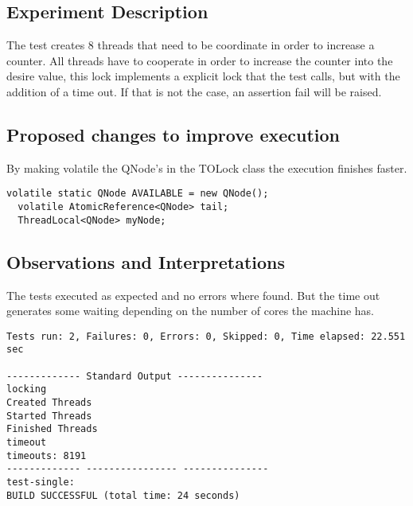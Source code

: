 \subsection{Experiment Description} 
\par
The test creates $8$ threads that need to be coordinate in order to increase a counter. All threads have to cooperate in order to increase the counter into the desire value, this lock implements a explicit lock that the test calls, but with the addition of a time out.
If that is not the case, an assertion fail will be raised.
\par


\subsection{Proposed changes to improve execution}

\par
By making volatile the QNode's in the TOLock class the execution finishes faster.
\begin{lstlisting}[frame=single,breaklines=true]
  volatile static QNode AVAILABLE = new QNode();
  volatile AtomicReference<QNode> tail;
  ThreadLocal<QNode> myNode;
\end{lstlisting}


\subsection{Observations and Interpretations}

\par
The tests executed as expected and no errors where found. But the time out generates some waiting depending on the number of cores the machine has.

\begin{lstlisting}[frame=single,breaklines=true]
Tests run: 2, Failures: 0, Errors: 0, Skipped: 0, Time elapsed: 22.551 sec

------------- Standard Output ---------------
locking
Created Threads
Started Threads
Finished Threads
timeout
timeouts: 8191
------------- ---------------- ---------------
test-single:
BUILD SUCCESSFUL (total time: 24 seconds)
\end{lstlisting}




